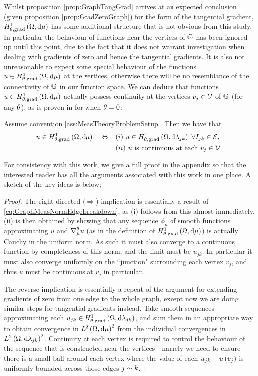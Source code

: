 Whilst proposition \ref{prop:GraphTangGrad} arrives at an expected conclusion (given proposition \ref{prop:GradZeroGraph}) for the form of the tangential gradient, $H^1_{\theta, \mathrm{grad}}\left( \Omega, \mathrm{d}\mu \right)$ has some additional structure that is not obvious from this study.
In particular the behaviour of functions near the vertices of $\mathbb{G}$ has been ignored up until this point, due to the fact that it does not warrant investigation when dealing with gradients of zero and hence the tangential gradients.
It is also not unreasonable to expect some special behaviour of the functions $u\in H^1_{\theta, \mathrm{grad}}\left( \Omega, \mathrm{d}\mu \right)$ at the vertices, otherwise there will be no resemblance of the connectivity of $\mathbb{G}$ in our function space.
We can deduce that functions $u\in H^1_{\theta, \mathrm{grad}}\left( \Omega, \mathrm{d}\mu \right)$ actually possess continuity at the vertices $v_j\in \mathcal{V}$ of $\mathbb{G}$ (for any $\theta$), as is proven in  for when $\theta=0$:
\begin{theorem} \label{thm:CharOfGradSob}
	Assume convention \ref{ass:MeasTheoryProblemSetup}.
	Then we have that
	\begin{align*}
		u\in H^1_{\theta, \mathrm{grad}}\left( \Omega, \mathrm{d}\mu \right) \quad\Leftrightarrow\quad 
		& (i) \ u\in H^1_{\theta, \mathrm{grad}}\left( \Omega, \mathrm{d}\lambda_{jk} \right) \ \forall I_{jk}\in \mathcal{E}, \\
		& (ii) \ u \text{ is continuous at each } v_j\in \mathcal{V}.
	\end{align*}
\end{theorem}
For consistency with this work, we give a full proof in the appendix so that the interested reader has all the arguments associated with this work in one place.
A sketch of the key ideas is below;
\begin{proof}
	The right-directed ($\Rightarrow$) implication is essentially a result of \eqref{eq:GraphMeasNormEdgeBreakdown}, as (i) follows from this almost immediately.
	(ii) is then obtained by showing that any sequence $\phi_n$ of smooth functions approximating $u$ and $\nabla^{\theta}_\mu u$ (as in the definition of $H^1_{\theta, \mathrm{grad}}\left( \Omega, \mathrm{d}\mu \right)$) is actually Cauchy in the uniform norm.
	As such it must also converge to a continuous function by completeness of this norm, and the limit must be $u_{jk}$.
	In particular it must also converge uniformly on the ``junction" surrounding each vertex $v_j$, and thus $u$ must be continuous at $v_j$ in particular. \newline
	
	The reverse implication is essentially a repeat of the argument for extending gradients of zero from one edge to the whole graph, except now we are doing similar steps for tangential gradients instead.
	Take smooth sequences approximating each $u_{jk}\in H^1_{\theta, \mathrm{grad}}\left( \Omega, \mathrm{d}\lambda_{jk} \right)$, and sum them in an appropriate way to obtain convergence in $L^{2}\left( \Omega,\mathrm{d}\mu \right)^2$ from the individual convergences in $L^{2}\left( \Omega,\mathrm{d}\lambda_{jk} \right)^2$.
	Continuity at each vertex is required to control the behaviour of the sequence that is constructed near the vertices - namely we need to ensure there is a small ball around each vertex where the value of each $u_{jk} - u\left( v_j \right)$ is uniformly bounded across those edges $j\sim k$.
\end{proof}